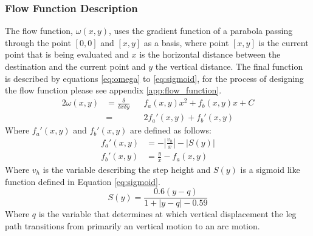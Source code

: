         \subsubsection{Flow Function Description} \label{sec:flow_function}
            The flow function, \(\omega(x,y)\), uses the gradient function of a parabola passing through the point \([0,0]\) and \([x,y]\) as a basis, where point \([x,y]\)
            is the current point that is being evaluated and \(x\) is the horizontal distance between the destination and the current point and \(y\) the
            vertical distance. The final function is described by equations \ref{eq:omega} to \ref{eq:sigmoid}, for the process of designing the flow function
            please see appendix \ref{app:flow_function}.
            \begin{equation} \label{eq:omega}
                \begin{aligned}{2}
                \omega(x,y) &= \frac{\delta}{\delta x\delta y}&&f_a(x,y)x^2 + f_b(x,y)x + C\\
                    &= &&2f_a'(x,y) + f_b'(x,y)    
                \end{aligned}
            \end{equation}
            Where \(f_a'(x,y)\) and \(f_b'(x,y)\) are defined as follows:
            \begin{align} \label{eq:fa}
                f_a'(x,y) &= -\left|\frac{v_h}{x}\right| - \left|S(y)\right|\\
                f_b'(x,y) &= \frac{y}{x} - f_a(x,y)
            \end{align}
            Where \(v_h\) is the variable describing the step height and \(S(y)\) is a sigmoid like function defined in Equation \ref{eq:sigmoid}.
            \begin{equation} \label{eq:sigmoid}
                S(y) = \frac{0.6(y-q)}{1+\left|y-q\right|-0.59}
            \end{equation}
            Where \(q\) is the variable that determines at which vertical displacement the leg path transitions from primarily an vertical motion to
            an arc motion.






